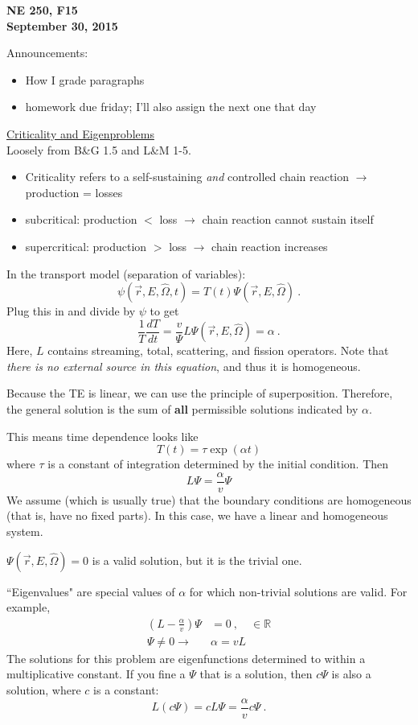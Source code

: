 \documentclass[12pt]{article}
\newcommand{\rvec}{\ensuremath{\vec{r}}}
\newcommand{\vOmega}{\ensuremath{\hat{\Omega}}}
\begin{document}
\begin{center}
{\bf NE 250, F15\\
September 30, 2015 
}
\end{center}

Announcements:
\begin{itemize}
\item How I grade paragraphs
\item homework due friday; I'll also assign the next one that day
\end{itemize}


\underline{Criticality and Eigenproblems}\\
Loosely from B\&G 1.5 and L\&M 1-5.
\begin{itemize}
\item Criticality refers to a self-sustaining \textit{and} controlled chain reaction $\rightarrow$ production = losses
\item subcritical: production $<$ loss $\rightarrow$ chain reaction cannot sustain itself
\item supercritical: production $>$ loss $\rightarrow$ chain reaction increases 
\end{itemize}
%
In the transport model (separation of variables):
\[\psi(\rvec, E, \vOmega, t) = T(t) \Psi(\rvec, E, \vOmega) \:.\]
Plug this in and divide by $\psi$ to get
\[\frac{1}{T}\frac{dT}{dt} = \frac{v}{\Psi} L \Psi(\rvec, E, \vOmega) = \alpha \:.\]
%
Here, $L$ contains streaming, total, scattering, and fission operators. Note that \textit{there is no external source in this equation}, and thus it is homogeneous.

Because the TE is linear, we can use the principle of superposition. 
Therefore, the general solution is the sum of \textbf{all} permissible solutions indicated by $\alpha$.

This means time dependence looks like
\[ T(t) = \tau \exp(\alpha t)\]
where $\tau$ is a constant of integration determined by the initial condition.
Then
\[L\Psi = \frac{\alpha}{v}\Psi\]
%
We assume (which is usually true) that the boundary conditions are homogeneous (that is, have no fixed parts).
In this case, we have a linear and homogeneous system.

$\Psi(\rvec, E, \vOmega) = 0$ is a valid solution, but it is the trivial one.

``Eigenvalues" are special values of $\alpha$ for which non-trivial solutions are valid.
For example,
\begin{align*}
(L - \frac{\alpha}{v})\Psi &= 0 \:, \quad \in \mathbb{R} \\
\Psi \neq 0 \rightarrow \: &\alpha = v L
\end{align*}
%
The solutions for this problem are eigenfunctions determined to within a multiplicative constant.
If you fine a $\Psi$ that is a solution, then $c \Psi$ is also a solution, where $c$ is a constant:
\[L(c \Psi) = cL \Psi = \frac{\alpha}{v}c \Psi \:.\]
\end{document}
